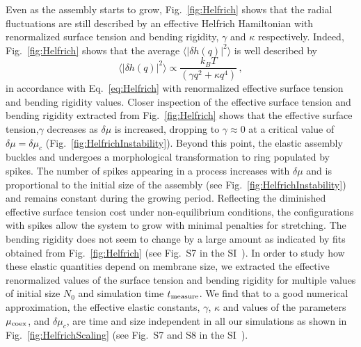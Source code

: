 \documentclass[amsmath,preprintnumbers,10pt,nofootinbib,prl,twocolumn]{revtex4-1}
\begin{document}
Even as the assembly starts to grow, Fig.~\ref{fig:Helfrich} shows that the radial fluctuations are still described by an effective Helfrich Hamiltonian with renormalized surface tension and bending rigidity, $\gamma$ and $\kappa$ respectively. Indeed, Fig.~\ref{fig:Helfrich} shows that the average $\langle |\delta h(q)|^2 \rangle$ is well described by 
\begin{equation}
\langle |\delta h(q)|^2 \rangle \propto \frac{k_B T}{(\gamma q^2 + \kappa q^4)}\,,
\label{eq:HelfrichFT}
\end{equation}
in accordance with Eq.~\ref{eq:Helfrich} with renormalized effective surface tension and bending rigidity values. Closer inspection of the effective surface tension and bending rigidity extracted from Fig.~\ref{fig:Helfrich} shows that the effective surface tension,$\gamma$ decreases as $\delta \mu$ is increased, dropping to $\gamma\approx 0$ at a critical value of $\delta \mu=\delta \mu_c$ (Fig.~\ref{fig:HelfrichInstability}). Beyond this point, the elastic assembly buckles and undergoes a morphological transformation to ring populated by \textit{}{spikes}. The number of spikes appearing in a process increases with $\delta\mu$ and is proportional to the initial size of the assembly (see Fig.~\ref{fig:HelfrichInstability}) and remains constant during the growing period. 
Reflecting the diminished effective surface tension cost under non-equilibrium conditions, the configurations with spikes allow the system to grow with minimal penalties for stretching. The bending rigidity does not seem to change by a large amount as indicated by fits obtained from Fig.~\ref{fig:Helfrich} (see Fig.~S7 in the SI~\cite{Supplementary}). In order to study how these elastic quantities depend on membrane size, we extracted the effective renormalized values of the surface tension and bending rigidity for multiple values of initial size $N_0$ and simulation time $t_{\rm measure}$. We find that to a good numerical approximation, the effective elastic constants, $\gamma$, $\kappa$ and values of the parameters $\mu_{\rm coex}$, and $\delta \mu_c$, are time and size independent in all our simulations as shown in Fig.~\ref{fig:HelfrichScaling} (see Fig.~S7 and S8 in the SI~\cite{Supplementary}). 

\end{document}
